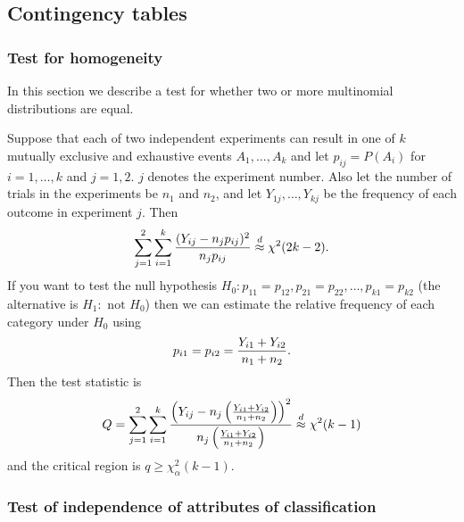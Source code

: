 \documentclass[10pt, two column]{article}
\begin{document}
\subsection{Contingency tables}

\subsubsection{Test for homogeneity}

In this section we describe a test for whether two or more multinomial distributions are equal. 

Suppose that each of two independent experiments can result in one of $k$ mutually exclusive and exhaustive events $A_{1}, \dots, A_{k}$ and let $p_{ij} = P(A_{i})$ for $i = 1, \dots, k$ and $j = 1, 2$. $j$ denotes the experiment number. Also let the number of trials in the experiments be $n_{1}$ and $n_{2}$, and let $Y_{1j}, \dots, Y_{kj}$ be the frequency of each outcome in experiment $j$. Then \vspace{-5pt}
\[
\sum_{j=1}^{2} \sum_{i=1}^{k} \frac{(Y_{ij} - n_{j}p_{ij})^{2}}{n_{j}p_{ij}} \stackrel{d}{\approx} \chi^{2}(2k-2). \vspace{-5pt}
\]
If you want to test the null hypothesis $H_{0}: p_{11}=p_{12}, p_{21}=p_{22}, \dots, p_{k1}=p_{k2}$ (the alternative is $H_{1}: \text{ not } H_{0}$) then we can estimate the relative frequency of each category under $H_{0}$ using \vspace{-5pt}
\[
p_{i1} = p_{i2} = \frac{Y_{i1} + Y_{i2}}{n_{1} + n_{2}}. \vspace{-5pt}
\]
Then the test statistic is \vspace{-5pt}
\[
Q=\sum_{j=1}^{2} \sum_{i=1}^{k} \frac{\left( Y_{ij} - n_{j}\left( \frac{Y_{i1} + Y_{i2}}{n_{1} + n_{2}}\right) \right)^{2}}{n_{j}\left( \frac{Y_{i1} + Y_{i2}}{n_{1} + n_{2}}\right)} \stackrel{d}{\approx} \chi^{2}(k-1) \vspace{-5pt}
\]
and the critical region is $q \geq \chi_{\alpha}^{2}(k-1)$. 

\subsubsection{Test of independence of attributes of classification}
\end{document}
